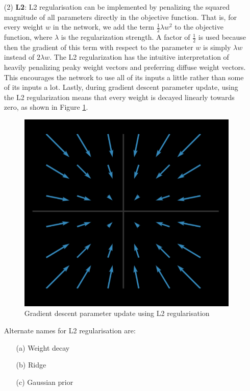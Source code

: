 \begin{itemize}
    \item[(2)] \textbf{L2}: L2 regularisation can be implemented by penalizing the squared magnitude of all parameters directly in the objective function.
    That is, for every weight $w$ in the network, we add the term $\frac{1}{2}\lambda w^2$ to the objective function, where $\lambda$ is the regularization strength.
    A factor of $\frac{1}{2}$ is used because then the gradient of this term with respect to the parameter $w$ is simply $\lambda w$ instead of $2\lambda w$.
    The L2 regularization has the intuitive interpretation of heavily penalizing peaky weight vectors and preferring diffuse weight vectors. 
    This encourages the network to use all of its inputs a little rather than some of its inputs a lot.
    Lastly, during gradient descent parameter update, using the L2 regularization means that every weight is decayed linearly towards zero, as shown in Figure \ref{fig:L2}.
    
    \begin{figure}
        \centering
        \includegraphics[scale=0.5]{labs/08/images/L2}
        \caption{Gradient descent parameter update using L2 regularisation}
        \label{fig:L2}
    \end{figure}
    
    Alternate names for L2 regularisation are:
    \begin{itemize}
        \item[(a)] Weight decay 
        \item[(b)] Ridge
        \item[(c)] Gaussian prior
    \end{itemize}
    

\end{itemize}
